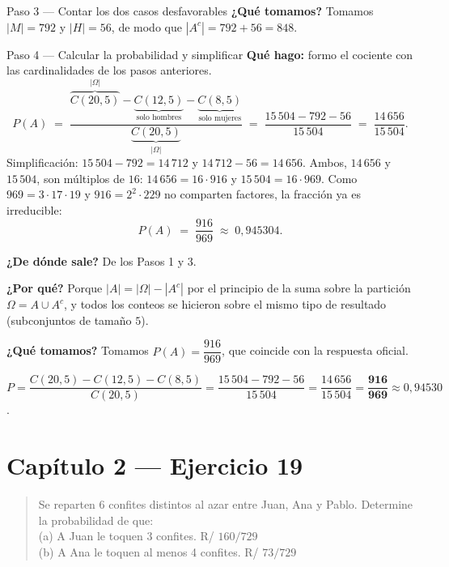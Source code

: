 \documentclass[11pt]{article}
\begin{document}
\begin{sol}
\begin{paso}{Paso 3 --- Contar los dos casos desfavorables}
\textbf{¿Qu\'e tomamos?} Tomamos $|M|=792$ y $|H|=56$, de modo que $|A^{c}|=792+56=848$.
\end{paso}

\begin{paso}{Paso 4 --- Calcular la probabilidad y simplificar}
\textbf{Qu\'e hago:} formo el cociente con las cardinalidades de los pasos anteriores.
\[
P(A)\;=\;\frac{\overbrace{C(20,5)}^{|\Omega|}-\underbrace{C(12,5)}_{\text{solo hombres}}-\underbrace{C(8,5)}_{\text{solo mujeres}}}{\underbrace{C(20,5)}_{|\Omega|}}
\;=\;\frac{15\,504-792-56}{15\,504}\;=\;\frac{14\,656}{15\,504}.
\]
Simplificaci\'on: $15\,504-792=14\,712$ y $14\,712-56=14\,656$. Ambos, $14\,656$ y $15\,504$, son m\'ultiplos de $16$: $14\,656=16\cdot 916$ y $15\,504=16\cdot 969$. Como $969=3\cdot 17\cdot 19$ y $916=2^{2}\cdot 229$ no comparten factores, la fracci\'on ya es irreducible:
\[
P(A)\;=\;\frac{916}{969}\;\approx\;0{,}945304 .
\]

\textbf{¿De d\'onde sale?} De los Pasos 1 y 3.

\textbf{¿Por qu\'e?} Porque $|A|=|\Omega|-|A^{c}|$ por el principio de la suma sobre la partici\'on $\Omega=A\cup A^{c}$, y todos los conteos se hicieron sobre el mismo tipo de resultado (subconjuntos de tama\~no $5$).

\textbf{¿Qu\'e tomamos?} Tomamos $P(A)=\dfrac{916}{969}$, que coincide con la respuesta oficial.
\end{paso}

\end{sol}

\begin{resp}
$P=\dfrac{C(20,5)-C(12,5)-C(8,5)}{C(20,5)}=\dfrac{15\,504-792-56}{15\,504}=\dfrac{14\,656}{15\,504}=\mathbf{\dfrac{916}{969}}\approx 0{,}94530$.
\end{resp}

\section*{Cap\'itulo 2 --- Ejercicio 19}

\begin{quote}
Se reparten 6 confites distintos al azar entre Juan, Ana y Pablo. Determine la probabilidad de que:\\[2pt]
(a) A Juan le toquen 3 confites. \hfill R/ $160/729$\\
(b) A Ana le toquen al menos 4 confites. \hfill R/ $73/729$
\end{quote}
\end{document}
